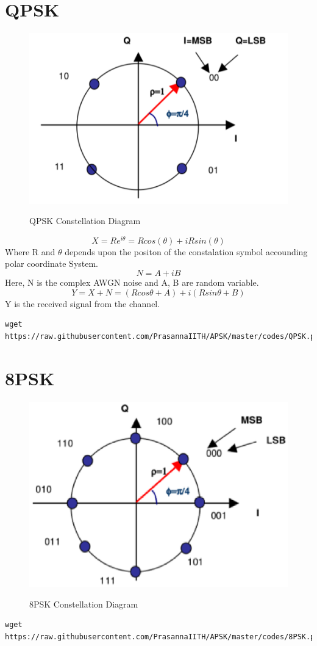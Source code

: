 \documentclass[journal,12pt,twocolumn]{IEEEtran}
\begin{document}
\section{QPSK}
\begin{figure}[h!]
\centering
\includegraphics[scale=0.4]{figs/qpsk_con}
\label{QPSK Constellation Diagram}
\caption{QPSK Constellation Diagram}
\end{figure}
$$X =Re^{i\theta} = Rcos(\theta) + iRsin(\theta)$$ 
Where R and $\theta$ depends upon the positon of the constalation symbol accounding polar coordinate System.
$$N = A + iB $$
Here, N is the complex AWGN noise and A, B are random variable.
$$ Y = X + N =(Rcos\theta + A) + i (Rsin\theta + B) $$
Y is the received signal from the channel.  
\begin{lstlisting}
wget https://raw.githubusercontent.com/PrasannaIITH/APSK/master/codes/QPSK.py
\end{lstlisting}
\section{8PSK}
\begin{figure}[h!]
\centering
\includegraphics[scale=0.4]{figs/8PSK_CON.eps}
\label{8PSK Constellation Diagram}
\caption{8PSK Constellation Diagram}
\end{figure}
\begin{lstlisting}
wget https://raw.githubusercontent.com/PrasannaIITH/APSK/master/codes/8PSK.py
\end{lstlisting}
\end{document}
